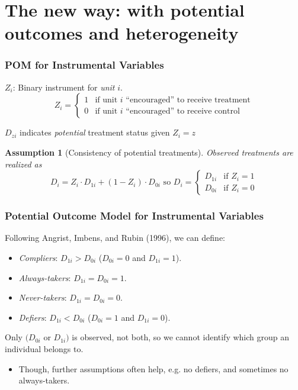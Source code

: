 \documentclass[xcolor=dvipsnames]{beamer}
\newtheorem{assumption}{Assumption}
\begin{document}
\section{The new way: with potential outcomes and heterogeneity}

\begin{frame}
  \frametitle{POM for Instrumental Variables}
 \begin{definition}[Instrument]
$Z_i$: Binary instrument for {\em unit} $i$.
 \[
 Z_i = \left\{
 \begin{array}{ll}
  1 & \mbox{if unit $i$ ``encouraged'' to receive treatment}\\
  0 & \mbox{if unit $i$ ``encouraged'' to receive control}
 \end{array}
 \right.
 \]
\end{definition}

 \begin{definition}
 $D_{zi}$ indicates \emph{potential} treatment status given $Z_i=z$
\end{definition}

 \begin{assumption}[Consistency  of potential treatments]
Observed treatments are realized as
\[
D_i = Z_i \cdot D_{1i}+(1-Z_i)\cdot D_{0i} \,\, \mbox{so}\,\,
D_i = \left\{
 \begin{array}{ll}
  D_{1i} & \mbox{if $Z_i=1$}\\
  D_{0i} & \mbox{if $Z_i=0$}
 \end{array}
 \right.
\]
\end{assumption}
\end{frame}


\begin{frame}
\frametitle{Potential Outcome Model for Instrumental Variables}
Following Angrist, Imbens, and Rubin (1996), we can define:\bigskip
\begin{Definition}
\begin{itemize}
 \item {\em Compliers}: $D_{1i}>D_{0i}$ ($D_{0i}=0$ and $D_{1i}=1$).
 \item {\em Always-takers}: $D_{1i}=D_{0i}=1$.
 \item {\em Never-takers}: $D_{1i}=D_{0i}=0$.
 \item {\em Defiers}: $D_{1i}<D_{0i}$ ($D_{0i}=1$ and $D_{1i}=0$).
\end{itemize}
\end{Definition}
\small
{}  Only  $(D_{0i}$ or $D_{1i})$ is observed, not both, so we cannot identify which group an individual belongs to.
\begin{itemize}
\item<3-> Though, further assumptions often help, e.g. no defiers, and sometimes no always-takers. 
\end{itemize}
\end{frame}
\end{document}
